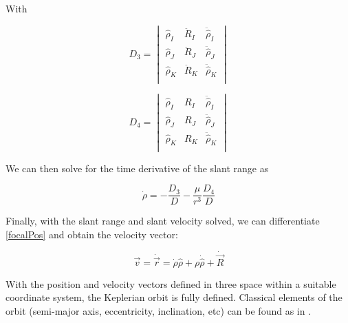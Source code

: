 \documentclass[11pt,twoside,letterpaper]{article}
\begin{document}
  With

  \begin{equation} \label{D3}
    D_3 = \begin{vmatrix}
    \hat{\rho}_I& \ddot{R}_I& \ddot{\hat{\rho}}_I \\
    \hat{\rho}_J& \ddot{R}_J& \ddot{\hat{\rho}}_J \\
    \hat{\rho}_K& \ddot{R}_K& \ddot{\hat{\rho}}_K \\
    \end{vmatrix}
  \end{equation}

  \begin{equation} \label{D4}
    D_4 = \begin{vmatrix}
    \hat{\rho}_I& R_I& \ddot{\hat{\rho}}_I \\
    \hat{\rho}_J& R_J& \ddot{\hat{\rho}}_J \\
    \hat{\rho}_K& R_K& \ddot{\hat{\rho}}_K \\
    \end{vmatrix}
  \end{equation}

  We can then solve for the time derivative of the slant range as

  \begin{equation} \label{slantDot}
    \dot{\rho} = -\frac{D_3}{D} - \frac{\mu}{r^3}\frac{D_4}{D}
  \end{equation}

  Finally, with the slant range and slant velocity solved, we can
  differentiate \ref{focalPos} and obtain the velocity vector:

  \begin{equation}\label{focalVel}
    \vec{v} = \dot{\vec{r}} =
    \dot{\rho}\hat{\rho} + \rho\dot{\hat{\rho}} + \dot{\vec{R}}
  \end{equation}

  With the position and velocity vectors defined in three space within
  a suitable coordinate system, the Keplerian orbit is fully
  defined. Classical elements of the orbit (semi-major axis,
  eccentricity, inclination, etc) can be found as in \cite{kluever_2018}.
    
  


  
  {}
  
\end{document}
